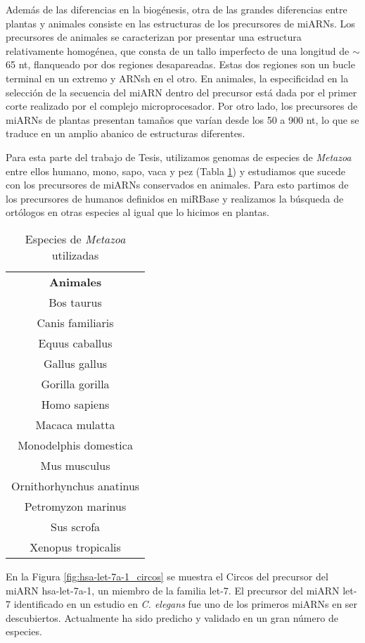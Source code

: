 Además de las diferencias en la biogénesis, otra de las grandes diferencias entre plantas y animales consiste en las estructuras de los precursores de miARNs.
Los precursores de animales se caracterizan por presentar una estructura relativamente homogénea, que consta de un tallo imperfecto de una longitud de $\sim$65 nt, flanqueado por dos regiones desapareadas.
Estas dos regiones son un bucle terminal en un extremo y ARNsh en el otro.
En animales, la especificidad en la selección de la secuencia del miARN dentro del precursor está dada por el primer corte realizado por el complejo microprocesador.
Por otro lado, los precursores de miARNs de plantas presentan tamaños que varían desde los 50 a 900 nt, lo que se traduce en un amplio abanico de estructuras diferentes.

Para esta parte del trabajo de Tesis, utilizamos genomas de especies de \textit{Metazoa} entre ellos humano, mono, sapo, vaca y pez (Tabla \ref{table:db_metazoa}) y estudiamos que sucede con los precursores de miARNs conservados en animales.
Para esto partimos de los precursores de humanos definidos en miRBase y realizamos la búsqueda de ortólogos en otras especies al igual que lo hicimos en plantas.

\begin{table}[!htbp]
\centering
\small
\caption{Especies de \textit{Metazoa} utilizadas}
\label{table:db_metazoa}
\begin{tabular}{c}
\rowcolor[HTML]{ECF4FF} 
\textbf{Animales}        \\
	Bos taurus               \\
	Canis familiaris         \\
	Equus caballus           \\
	Gallus gallus            \\
	Gorilla gorilla          \\
	Homo sapiens             \\
	Macaca mulatta           \\
	Monodelphis domestica    \\
	Mus musculus             \\
	Ornithorhynchus anatinus \\
	Petromyzon marinus       \\
	Sus scrofa               \\
	Xenopus tropicalis      
\end{tabular}
\end{table}

En la Figura \ref{fig:hsa-let-7a-1_circos} se muestra el Circos del precursor del miARN hsa-let-7a-1, un miembro de la familia let-7.
El precursor del miARN let-7 identificado en un estudio en \textit{C. elegans} fue uno de los primeros miARNs en ser descubiertos.
Actualmente ha sido predicho y validado en un gran número de especies.

